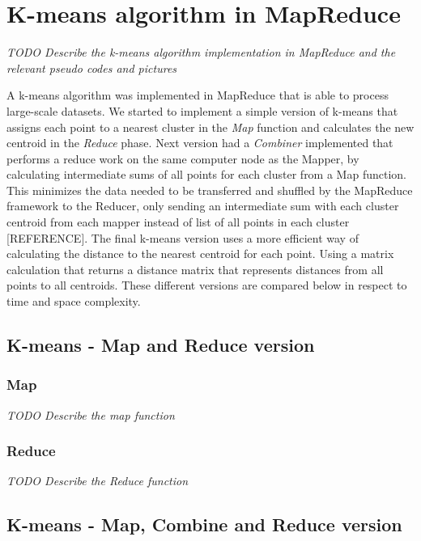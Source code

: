 \section{K-means algorithm in MapReduce}
\textit{TODO Describe the k-means algorithm implementation in MapReduce and the relevant pseudo codes and pictures}


A k-means algorithm was implemented in MapReduce that is able to process large-scale datasets. We started to implement a simple version of k-means that assigns each point to a nearest cluster in the \textit{Map} function and calculates the new centroid in the \textit{Reduce} phase. Next version had a \textit{Combiner} implemented that performs a reduce work on the same computer node as the Mapper, by calculating intermediate sums of all points for each cluster from a Map function. This minimizes the data needed to be transferred and shuffled by the MapReduce framework to the Reducer, only sending an intermediate sum with each cluster centroid from each mapper instead of list of all points in each cluster [REFERENCE]. The final k-means version uses a more efficient way of calculating the distance to the nearest centroid for each point. Using a matrix calculation that returns a distance matrix that represents distances from all points to all centroids. These different versions are compared below in respect to time and space complexity.


\subsection{K-means - Map and Reduce version}
\lipsum[1]

\subsubsection{Map}
\textit{TODO Describe the map function}

\lipsum[1-2]


\subsubsection{Reduce}
\textit{TODO Describe the Reduce function}

\lipsum[7-8]

\subsection{K-means - Map, Combine and Reduce version}
\lipsum[1]


